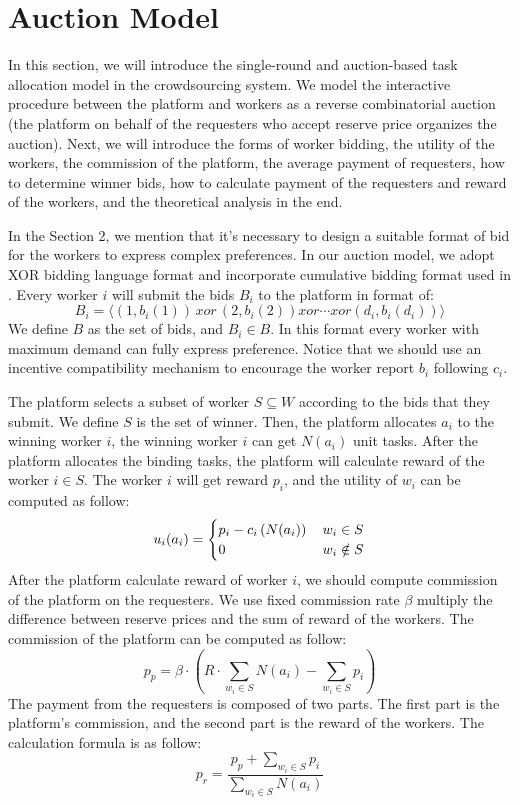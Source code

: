 \section{Auction Model}
In this section, we will introduce the single-round and auction-based task allocation model in the crowdsourcing system. We model the interactive procedure between the platform and workers as a reverse combinatorial auction (the platform on behalf of the requesters who accept reserve price organizes the auction). Next, we will introduce the forms of worker bidding, the utility of the workers, the commission of the platform, the average payment of requesters, how to determine winner bids, how to calculate payment of the requesters and reward of the workers, and the theoretical analysis in the end.

In the Section 2, we mention that it's necessary to design a suitable format of bid for the workers to express complex preferences. In our auction model, we adopt XOR bidding language format\cite{Cramton2006Combinatorial} and incorporate cumulative bidding format used in \cite{DBLP:journals/twc/ZhanCLL14}. Every worker $i$ will submit the bids $B_i$ to the platform in format of:
$$B_i = \langle \left(1,b_i(1)\right)\,xor\,\left(2,b_i(2)\right) xor \cdots xor \left(d_i,b_i(d_i)\right)\rangle$$
We define $B$ as the set of bids, and $B_i \in B$. In this format every worker with maximum demand can fully express preference. Notice that we should use an incentive compatibility mechanism to encourage the worker report $b_i$ following $c_i$.

The platform selects a subset of worker $S \subseteq W$ according to the bids that they submit. We define $S$ is the set of winner. Then, the platform allocates $a_i$ to the winning worker $i$, the winning worker $i$ can get $N(a_i)$ unit tasks. After the platform allocates the binding tasks, the platform will calculate reward of the worker $i \in S$. The worker $i$ will get reward $p_i$, and the utility of $w_i$ can be computed as follow:
\begin{equation}\label{eq2}
u_i(a_i)=
\begin{cases}
    p_i - c_i\left(N(a_i)\right)  \, & \text{$ w_i \in S$}\\
    0                             \, & \text{$ w_i \notin S$}
\end{cases}
\end{equation}
After the platform calculate reward of worker $i$, we should compute commission of the platform on the requesters. We use fixed commission rate $\beta$ multiply the difference between reserve prices and the sum of reward of the workers. The commission of the platform can be computed as follow:
\begin{equation}\label{eq3}
  p_p = \beta \cdot \left( R \cdot \sum_{w_i \in S}N(a_i) - \sum_{w_i \in S}{p_i}\right)
\end{equation}
The payment from the requesters is composed of two parts. The first part is the platform's commission, and the second part is the reward of the workers. The calculation formula is as follow:
\begin{equation}\label{eq4}
  p_r = \frac{p_p + \sum_{w_i \in S}{p_i}}{\sum_{w_i \in S}N(a_i)}
\end{equation}

